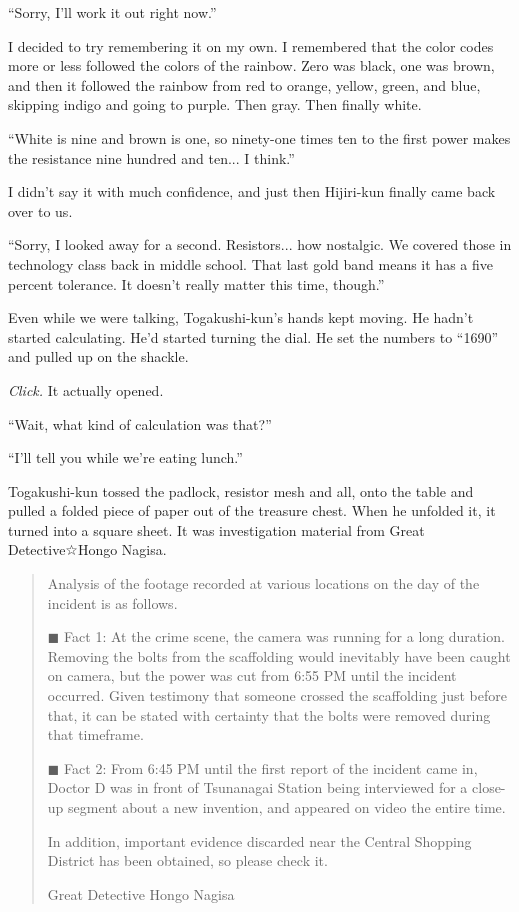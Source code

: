 \documentclass[
    a4paper,
    12pt,
    twoside,
    openany,
    UTF8,
    fontset=windows
]{ctexbook}
\begin{document}
``Sorry, I'll work it out right now.''

I decided to try remembering it on my own. I remembered that the color codes more or less followed the colors of the rainbow. Zero was black, one was brown, and then it followed the rainbow from red to orange, yellow, green, and blue, skipping indigo and going to purple. Then gray. Then finally white.

``White is nine and brown is one, so ninety-one times ten to the first power makes the resistance nine hundred and ten... I think.''

I didn't say it with much confidence, and just then Hijiri-kun finally came back over to us.

``Sorry, I looked away for a second. Resistors... how nostalgic. We covered those in technology class back in middle school. That last gold band means it has a five percent tolerance. It doesn't really matter this time, though.''

Even while we were talking, Togakushi-kun's hands kept moving. He hadn't started calculating. He'd started turning the dial. He set the numbers to ``1690'' and pulled up on the shackle.

\textit{Click.} It actually opened.

``Wait, what kind of calculation was that?''

``I'll tell you while we're eating lunch.''

Togakushi-kun tossed the padlock, resistor mesh and all, onto the table and pulled a folded piece of paper out of the treasure chest. When he unfolded it, it turned into a square sheet. It was investigation material from Great Detective☆Hongo Nagisa.

\begin{quote}
Analysis of the footage recorded at various locations on the day of the incident is as follows.

\noindent $\blacksquare$ Fact 1: At the crime scene, the camera was running for a long duration. Removing the bolts from the scaffolding would inevitably have been caught on camera, but the power was cut from 6:55 PM until the incident occurred. Given testimony that someone crossed the scaffolding just before that, it can be stated with certainty that the bolts were removed during that timeframe.

\noindent $\blacksquare$ Fact 2: From 6:45 PM until the first report of the incident came in, Doctor D was in front of Tsunanagai Station being interviewed for a close-up segment about a new invention, and appeared on video the entire time.

In addition, important evidence discarded near the Central Shopping District has been obtained, so please check it.

\begin{flushright}
Great Detective Hongo Nagisa
\end{flushright}
\end{quote}
\end{document}
